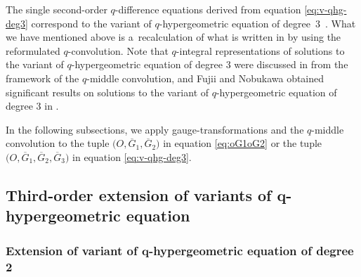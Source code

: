\documentclass[pdftex]{sigma}
\numberwithin{equation}{section}
\theoremstyle{definition}
\begin{document}
The single second-order $q$-difference equations derived from equation \eqref{eq:v-qhg-deg3} correspond to the variant of $q$-hypergeometric equation of degree~$3$~\cite{HMST}.
What we have mentioned above is a~recalculation of what is written in \cite{AT} by using the reformulated $q$-convolution.
Note that $q$-integral representations of solutions to the variant of $q$-hypergeometric equation of degree $3$ were discussed in \cite{AT} from the framework of the $q$-middle convolution, and Fujii and Nobukawa obtained significant results on solutions to the variant of $q$-hypergeometric equation of degree $3$ in \cite{FN}.

In the following subsections, we apply gauge-transformations and the $q$-middle convolution to the tuple $\bigl(O, \overline{G}_1, \overline{G}_2 \bigr) $ in equation \eqref{eq:oG1oG2} or the tuple $\bigl(O, \overline{G}_1, \overline{G}_2, \overline{G}_3 \bigr) $ in equation \eqref{eq:v-qhg-deg3}.

\subsection[Third-order extension of variants of q-hypergeometric equation]{Third-order extension of variants of $\boldsymbol{q}$-hypergeometric equation} \label{subsec:3exte}

\subsubsection[Extension of variant of q-hypergeometric equation of degree 2]{Extension of variant of $\boldsymbol{q}$-hypergeometric equation of degree 2} \label{subsec:3extedeg2}
\end{document}
